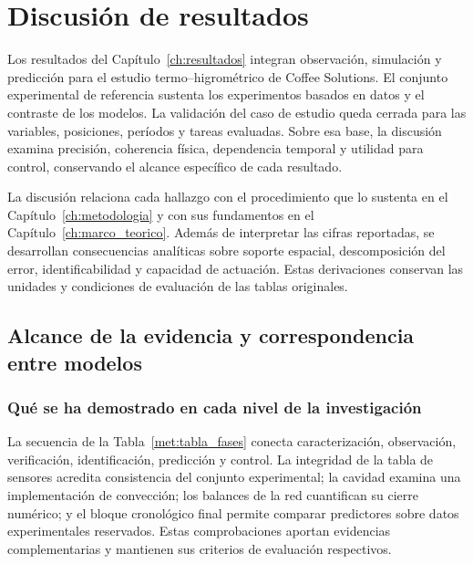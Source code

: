 
\chapter{Discusión de resultados}
\label{ch:discusion}

Los resultados del Capítulo~\ref{ch:resultados} integran observación, simulación y predicción para el estudio termo--higrométrico de Coffee Solutions. El conjunto experimental de referencia sustenta los experimentos basados en datos y el contraste de los modelos. La validación del caso de estudio queda cerrada para las variables, posiciones, períodos y tareas evaluadas. Sobre esa base, la discusión examina precisión, coherencia física, dependencia temporal y utilidad para control, conservando el alcance específico de cada resultado.

La discusión relaciona cada hallazgo con el procedimiento que lo sustenta en el Capítulo~\ref{ch:metodologia} y con sus fundamentos en el Capítulo~\ref{ch:marco_teorico}. Además de interpretar las cifras reportadas, se desarrollan consecuencias analíticas sobre soporte espacial, descomposición del error, identificabilidad y capacidad de actuación. Estas derivaciones conservan las unidades y condiciones de evaluación de las tablas originales.

\section{Alcance de la evidencia y correspondencia entre modelos}
\label{dis:alcance}

\subsection{Qué se ha demostrado en cada nivel de la investigación}

La secuencia de la Tabla~\ref{met:tabla_fases} conecta caracterización, observación, verificación, identificación, predicción y control. La integridad de la tabla de sensores acredita consistencia del conjunto experimental; la cavidad examina una implementación de convección; los balances de la red cuantifican su cierre numérico; y el bloque cronológico final permite comparar predictores sobre datos experimentales reservados. Estas comprobaciones aportan evidencias complementarias y mantienen sus criterios de evaluación respectivos.

